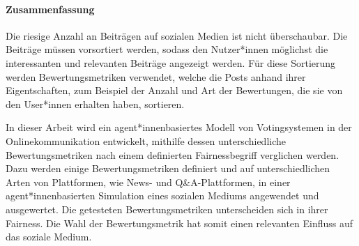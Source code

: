 \markboth{}{}
\paragraph{Zusammenfassung}
Die riesige Anzahl an Beiträgen auf sozialen Medien ist nicht überschaubar. Die Beiträge müssen vorsortiert werden, sodass den Nutzer*innen möglichst die interessanten und relevanten Beiträge angezeigt werden. Für diese Sortierung werden Bewertungsmetriken verwendet, welche die Posts anhand ihrer Eigentschaften, zum Beispiel der Anzahl und Art der Bewertungen, die sie von den User*innen erhalten haben, sortieren.

In dieser Arbeit wird ein agent*innenbasiertes Modell von Votingsystemen in der Onlinekommunikation entwickelt, mithilfe dessen unterschiedliche Bewertungsmetriken nach einem definierten Fairnessbegriff verglichen werden. Dazu werden einige Bewertungsmetriken definiert und auf unterschiedlichen Arten von Plattformen, wie News- und Q\&A-Plattformen, in einer agent*innenbasierten Simulation eines sozialen Mediums angewendet und ausgewertet. Die getesteten Bewertungsmetriken unterscheiden sich in ihrer Fairness. Die Wahl der Bewertungsmetrik hat somit einen relevanten Einfluss auf das soziale Medium.
	
	